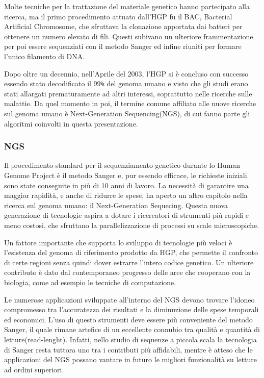 Molte tecniche per la trattazione del materiale genetico hanno partecipato alla ricerca, ma il primo procedimento attuato dall'HGP fu il BAC, Bacterial Artificial Chromosome, che sfruttava la clonazione apportata dai batteri per ottenere un numero elevato di fili.
Questi subivano un ulteriore frammentazione per poi essere sequenziati con il metodo Sanger ed infine riuniti per formare l'unico filamento di DNA.

Dopo oltre un decennio, nell'Aprile del 2003, l'HGP si è concluso con successo essendo stato decodificato il 99\verb!%! del genoma umano e visto che gli studi erano stati allargati prematuramente ad altri interessi, soprattutto nelle ricerche sulle malattie.
Da quel momento in poi, il termine comune affiliato alle nuove ricerche sul genoma umano è Next-Generation Sequencing(NGS), di cui fanno parte gli algoritmi coinvolti in questa presentazione.

\subsubsection{NGS}
Il procedimento standard per il sequenziamento genetico durante lo Human Genome Project è il metodo Sanger e, pur essendo efficace, le richieste iniziali sono state conseguite in più di 10 anni di lavoro.
La necessità di garantire una maggior rapidità, e anche di ridurre le spese, ha aperto un altro capitolo nella ricerca sul genoma umano: il Next-Generation Sequecing.
Questa nuova generazione di tecnologie aspira a dotare i ricercatori di strumenti più rapidi e meno costosi, che sfruttano la parallelizzazione di processi su scale microscopiche.

Un fattore importante che supporta lo sviluppo di tecnologie più veloci è l'esistenza del genoma di riferimento prodotto da HGP, che permette il confronto di certe regioni senza quindi dover estrarre l'intero codice genetico.
Un ulteriore contributo è dato dal contemporaneo progresso delle aree che cooperano con la biologia, come ad esempio le tecniche di computazione.

Le numerose applicazioni sviluppate all'interno del NGS devono trovare l'idoneo compromesso tra l'accuratezza dei risultati e la diminuzione delle spese temporali ed economici.
L'uso di questo strumenti deve essere più conveniente del metodo Sanger, il quale rimane artefice di un eccellente connubio tra qualità e quantità di letture(read-lenght).
Infatti, nello studio di sequenze a piccola scala la tecnologia di Sanger resta tuttora uno tra i contributi più affidabili, mentre è atteso che le applicazioni del NGS possano vantare in futuro le migliori funzionalità su letture ad ordini superiori.

